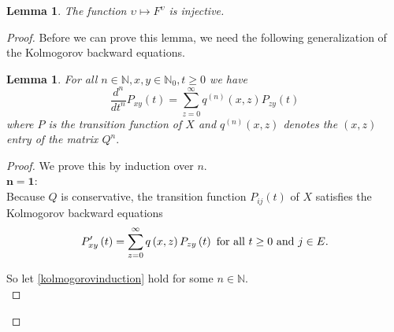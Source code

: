\documentclass[12pt,a4paper]{scrartcl}
\newtheorem{lemma}[theorem]{Lemma}
\numberwithin{equation}{section}
\newcommand{\N}{\mathbb{N}} %
\begin{document}
\begin{lemma} \label{lemmainitialmeasuredetermined}
The function $\upsilon \mapsto F^{\upsilon}$ is injective.
\end{lemma}
\begin{proof}

Before we can prove this lemma, we need the following generalization of the Kolmogorov backward equations.

\begin{lemma}
For all $n \in \N, x, y \in \N_0, t \geq 0 $ we have 
\begin{equation} \label{kolmogorovinduction}
\frac{d^n}{dt^n} P_{xy}\left(t\right) = \sum_{z=0}^{\infty} q^{\left(n\right)}\left(x,z\right) P_{zy}\left(t\right)
\end{equation}
where $P$ is the transition function of $X$ and $q^{\left(n\right)}\left(x,z\right)$ denotes the $\left(x,z\right)$ entry of the matrix $Q^n.$
\end{lemma}
\begin{proof}
We prove this by induction over $n$.\\[1em]

$\mathbf{n=1}$:\\
Because $Q$ is conservative, the transition function $P_{ij}\left(t\right)$ of $X$ satisfies the Kolmogorov backward equations $$P_{xy}'\left(t\right) = \sum_{z = 0}^{\infty} q\left(x,z\right) P_{zy}\left(t\right) \textnormal{ for all } t\geq0 \textnormal{ and } j\in E. $$ 

So let \ref{kolmogorovinduction} hold for some $n \in \N$.\\[1em]


\end{proof}
\end{proof}
\end{document}
